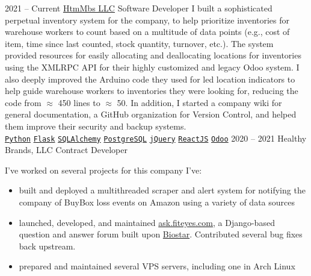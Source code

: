 \documentclass[9pt]{developercv} %
\begin{document}
\begin{entrylist}
    \entry
        {2021 -- Current}
        {\href{https://mbs-standoffs.com}{HtmMbs LLC}}
        {Software Developer}
        {
            I built a sophisticated perpetual inventory system for the company,
            to help prioritize inventories for warehouse workers to count based
            on a multitude of data points (e.g., cost of item, time since last
            counted, stock quantity, turnover, etc.). The system provided
            resources for easily allocating and deallocating locations for
            inventories using the XMLRPC API for their highly customized and
            legacy Odoo system. I also deeply improved the Arduino code they
            used for led location indicators to help guide warehouse workers to
            inventories they were looking for, reducing the code from $\approx$
            450 lines to $\approx$ 50. In addition, I started a company wiki for
            general documentation, a GitHub organization for Version Control,
            and helped them improve their security and backup systems.
            \\
            \texttt{{\href{https://www.python.org/}{Python}}}\slashsep
            \texttt{{\href{https://flask.palletsprojects.com/en/1.1.x/}{Flask}}}\slashsep
            \texttt{{\href{https://www.sqlalchemy.org/}{SQLAlchemy}}}\slashsep
            \texttt{{\href{https://www.postgresql.org/}{PostgreSQL}}}\slashsep
            \texttt{{\href{https://jquery.com/}{jQuery}}}\slashsep
            \texttt{{\href{https://reactjs.org/}{ReactJS}}}\slashsep
            \texttt{{\href{https://www.odoo.com/}{Odoo}}}
        }
    \entry
        {2020 -- 2021}
        {Healthy Brands, LLC}
        {Contract Developer}
        {
            I've worked on several projects for this company I've:
            \begin{itemize}[leftmargin=*, noitemsep]
                \item built and deployed a multithreaded scraper and alert system for notifying the company of BuyBox loss events on Amazon using a variety of data sources
                \item launched, developed, and maintained {\href{https://ask.fiteyes.com}{ask.fiteyes.com}}, a Django-based question and answer forum built upon {\href{https://github.com/ialbert/biostar-central}{Biostar}}.  Contributed several bug fixes back upstream.
                \item prepared and maintained several VPS servers, including one in Arch Linux

\end{itemize}}
\end{entrylist}
\end{document}
